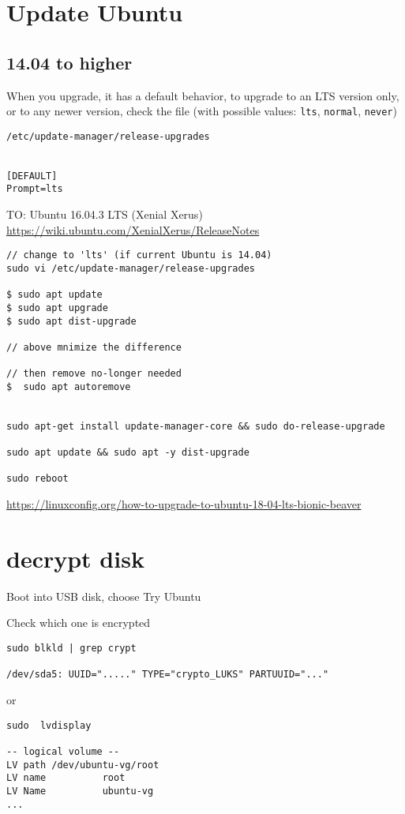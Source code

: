 \section{Update Ubuntu}


\subsection{14.04 to higher}

When you upgrade, it has a default behavior, to upgrade to an LTS version only, or to any newer version,
check the file (with possible values: \verb!lts!, \verb!normal!, \verb!never!)
\begin{verbatim}
/etc/update-manager/release-upgrades


[DEFAULT]
Prompt=lts
\end{verbatim}

TO: Ubuntu 16.04.3 LTS (Xenial Xerus)
\url{https://wiki.ubuntu.com/XenialXerus/ReleaseNotes}

\begin{verbatim}
// change to 'lts' (if current Ubuntu is 14.04)
sudo vi /etc/update-manager/release-upgrades

$ sudo apt update 
$ sudo apt upgrade
$ sudo apt dist-upgrade

// above mnimize the difference

// then remove no-longer needed
$  sudo apt autoremove


sudo apt-get install update-manager-core && sudo do-release-upgrade

sudo apt update && sudo apt -y dist-upgrade

sudo reboot
\end{verbatim}

\url{https://linuxconfig.org/how-to-upgrade-to-ubuntu-18-04-lts-bionic-beaver}

\section{decrypt disk}
\label{sec:decrypt-LVM-disk}

Boot into USB disk, choose Try Ubuntu

Check which one is encrypted
\begin{verbatim}
sudo blkld | grep crypt

/dev/sda5: UUID="....." TYPE="crypto_LUKS" PARTUUID="..."
\end{verbatim}
or
\begin{verbatim}
sudo  lvdisplay

-- logical volume --
LV path /dev/ubuntu-vg/root
LV name          root
LV Name          ubuntu-vg
...
\end{verbatim}


